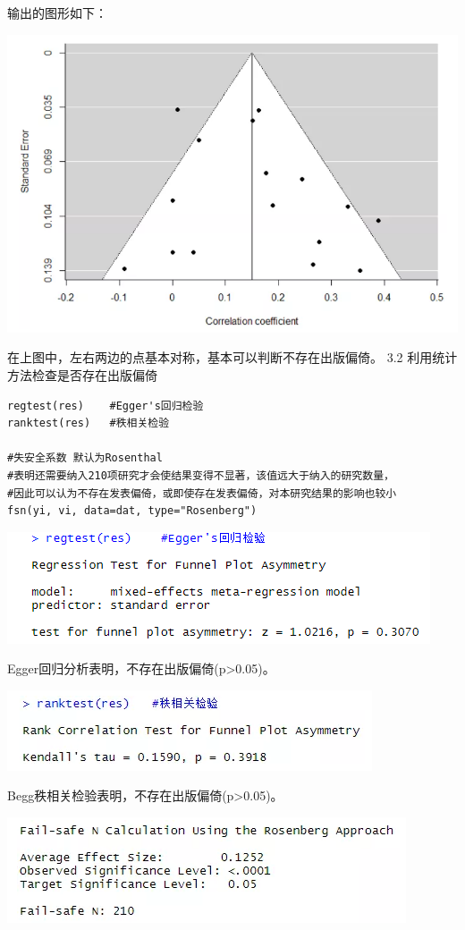 \documentclass[
]{book}
\begin{document}
输出的图形如下：

\includegraphics{figs/3231.png}

在上图中，左右两边的点基本对称，基本可以判断不存在出版偏倚。
3.2 利用统计方法检查是否存在出版偏倚

\begin{verbatim}
regtest(res)    #Egger's回归检验
ranktest(res)   #秩相关检验

#失安全系数 默认为Rosenthal
#表明还需要纳入210项研究才会使结果变得不显著，该值远大于纳入的研究数量，
#因此可以认为不存在发表偏倚，或即使存在发表偏倚，对本研究结果的影响也较小
fsn(yi, vi, data=dat, type="Rosenberg")  
\end{verbatim}

\includegraphics{figs/3232.png}

Egger回归分析表明，不存在出版偏倚(p\textgreater0.05)。

\includegraphics{figs/3233.png}

Begg秩相关检验表明，不存在出版偏倚(p\textgreater0.05)。

\includegraphics{figs/3234.png}
\end{document}
